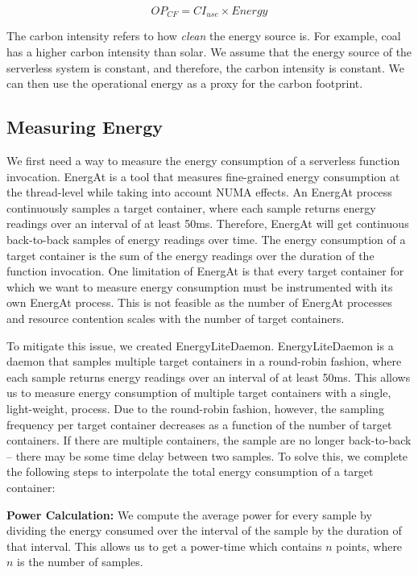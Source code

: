 \documentclass[times, 10pt,twocolumn]{article}
\begin{document}
\begin{equation}
   OP_{CF} = CI_{use} \times Energy
\end{equation}

The carbon intensity refers to how \textit{clean} the energy source is. For example, coal has a higher carbon intensity than solar. We assume that the energy source of the serverless system is constant, and therefore, the carbon intensity is constant. We can then use the operational energy as a proxy for the carbon footprint.

\subsection{Measuring Energy}
We first need a way to measure the energy consumption of a serverless function invocation. EnergAt \cite{he2023hotcarbon} is a tool that measures fine-grained energy consumption at the thread-level while taking into account NUMA effects. An EnergAt process continuously samples a target container, where each sample returns energy readings over an interval of at least 50ms. Therefore, EnergAt will get continuous back-to-back samples of energy readings over time. The energy consumption of a target container is the sum of the energy readings over the duration of the function invocation. One limitation of EnergAt is that every target container for which we want to measure energy consumption must be instrumented with its own EnergAt process. This is not feasible as the number of EnergAt processes and resource contention scales with the number of target containers.

To mitigate this issue, we created EnergyLiteDaemon. EnergyLiteDaemon is a daemon that samples multiple target containers in a round-robin fashion, where each sample returns energy readings over an interval of at least 50ms. This allows us to measure energy consumption of multiple target containers with a single, light-weight, process. Due to the round-robin fashion, however, the sampling frequency per target container decreases as a function of the number of target containers. If there are multiple containers, the sample are no longer back-to-back -- there may be some time delay between two samples. To solve this, we complete the following steps to interpolate the total energy consumption of a target container:

\textbf{Power Calculation:} We compute the average power for every sample by dividing the energy consumed over the interval of the sample by the duration of that interval. This allows us to get a power-time which contains $n$ points, where $n$ is the number of samples.
\end{document}
